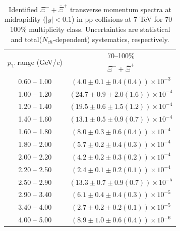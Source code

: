 \begin{table}
\caption{Identified $\Xi^{-} + \bar{\Xi}^{+}$ transverse momentum spectra at midrapidity ($|y|<0.1$) in pp collisions at 7 TeV for 70--100\% multiplicity class. Uncertainties are statistical and total($N_{ch}$-dependent) systematics, respectively.}
\label{tab:XiSum_70to100}
\begin{center}
\begin{tabular}{ c | c }
\hline
\multirow{2}{*}{$p_{\mathrm{T}}$ range (GeV/\textit{c})} & \multicolumn{1}{c}{70--100\%} \\ & $\Xi^{-} + \bar{\Xi}^{+}$\\ 
\hline
0.60 -- 1.00 & $(4.0\pm0.1\pm0.4(0.4))\times10^{-3}$ \\ 
1.00 -- 1.20 & $(24.7\pm0.9\pm2.0(1.6))\times10^{-4}$ \\ 
1.20 -- 1.40 & $(19.5\pm0.6\pm1.5(1.2))\times10^{-4}$ \\ 
1.40 -- 1.60 & $(13.1\pm0.5\pm0.9(0.7))\times10^{-4}$ \\ 
1.60 -- 1.80 & $(8.0\pm0.3\pm0.6(0.4))\times10^{-4}$ \\ 
1.80 -- 2.00 & $(5.7\pm0.2\pm0.4(0.3))\times10^{-4}$ \\ 
2.00 -- 2.20 & $(4.2\pm0.2\pm0.3(0.2))\times10^{-4}$ \\ 
2.20 -- 2.50 & $(2.4\pm0.1\pm0.2(0.1))\times10^{-4}$ \\ 
2.50 -- 2.90 & $(13.3\pm0.7\pm0.9(0.7))\times10^{-5}$ \\ 
2.90 -- 3.40 & $(6.1\pm0.4\pm0.4(0.3))\times10^{-5}$ \\ 
3.40 -- 4.00 & $(2.7\pm0.2\pm0.2(0.1))\times10^{-5}$ \\ 
4.00 -- 5.00 & $(8.9\pm1.0\pm0.6(0.4))\times10^{-6}$ \\ 
\hline
\end{tabular}
\end{center}
\end{table}
 
